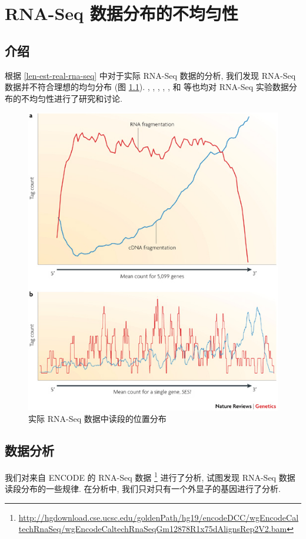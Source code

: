 \chapter{RNA-Seq 数据分布的不均匀性}
\label{chap-rna-seq-nonunif}

\section{介绍}
根据 \ref{len-est-real-rna-seq} 中对于实际 RNA-Seq 数据的分析, 
我们发现 RNA-Seq 数据并不符合理想的均匀分布 (图 \ref{rna-seq-bias}). 
, , 
, , , 和
 等也均对 RNA-Seq 实验数据分布的不均匀性进行了研究和讨论. 

\begin{figure}[!t]
\centering
\includegraphics[width=\textwidth]{figures/nonunif/rna-seq-bias.jpg}
\caption{实际 RNA-Seq 数据中读段的位置分布 \cite{wang2009rna}}
\label{rna-seq-bias}
\end{figure}

\section{数据分析}
我们对来自 ENCODE \cite{encode} 的 RNA-Seq 数据 
\footnote{\url{http://hgdownload.cse.ucsc.edu/goldenPath/hg19/encodeDCC/wgEncodeCaltechRnaSeq/wgEncodeCaltechRnaSeqGm12878R1x75dAlignsRep2V2.bam}} 
进行了分析, 试图发现 RNA-Seq 数据读段分布的一些规律. 
在分析中, 我们只对只有一个外显子的基因进行了分析.

